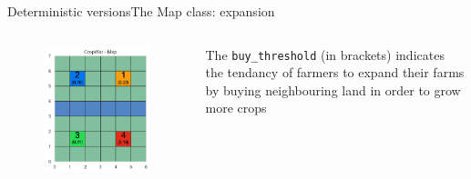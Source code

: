 \documentclass[10pt, aspectratio=169]{beamer}
\def\aa{Deterministic versions}
\def\aab{The Map class: expansion}
\begin{document}
\begin{frame}{\aa}{\aab}
  \begin{columns}
    \centering
    \begin{figure}
      \includegraphics[width=.8\textwidth]{Figures/v12_Map_start.png}
     \end{figure}
     The \texttt{buy\_threshold} (in brackets) indicates the tendancy of farmers to expand their farms by buying neighbouring land in order to grow more crops
  \end{columns}
\end{frame}



\end{document}
